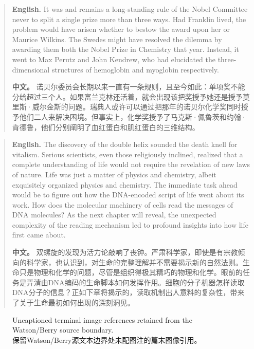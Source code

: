 \begin{quote}
\noindent\textbf{English.} It was and remains a long-standing rule of the Nobel Committee never to split a single prize more than three ways. Had Franklin lived, the problem would have arisen whether to bestow the award upon her or Maurice Wilkins. The Swedes might have resolved the dilemma by awarding them both the Nobel Prize in Chemistry that year. Instead, it went to Max Perutz and John Kendrew, who had elucidated the three-dimensional structures of hemoglobin and myoglobin respectively.

\smallskip
\noindent\textbf{中文。} 诺贝尔委员会长期以来一直有一条规则，且至今如此：单项奖不能分给超过三个人。如果富兰克林还活着，就会出现该把奖授予她还是授予莫里斯·威尔金斯的问题。瑞典人或许可以通过把那年的诺贝尔化学奖同时授予他们二人来解决困境。但事实上，化学奖授予了马克斯·佩鲁茨和约翰·肯德鲁，他们分别阐明了血红蛋白和肌红蛋白的三维结构。
\end{quote}

\begin{quote}
\noindent\textbf{English.} The discovery of the double helix sounded the death knell for vitalism. Serious scientists, even those religiously inclined, realized that a complete understanding of life would not require the revelation of new laws of nature. Life was just a matter of physics and chemistry, albeit exquisitely organized physics and chemistry. The immediate task ahead would be to figure out how the DNA-encoded script of life went about its work. How does the molecular machinery of cells read the messages of DNA molecules? As the next chapter will reveal, the unexpected complexity of the reading mechanism led to profound insights into how life first came about.

\smallskip
\noindent\textbf{中文。} 双螺旋的发现为活力论敲响了丧钟。严肃科学家，即使是有宗教倾向的科学家，也认识到，对生命的完整理解并不需要揭示新的自然法则。生命只是物理和化学的问题，尽管是组织得极其精巧的物理和化学。眼前的任务是弄清由DNA编码的生命脚本如何发挥作用。细胞的分子机器怎样读取DNA分子的信息？正如下章将揭示的，读取机制出人意料的复杂性，带来了关于生命最初如何出现的深刻洞见。
\end{quote}

\begin{figure}[htbp]
\centering
{}
\hfill
{}
\hfill
{}
\caption{Uncaptioned terminal image references retained from the Watson/Berry source boundary.\\保留Watson/Berry源文本边界处未配图注的篇末图像引用。}
\end{figure}
